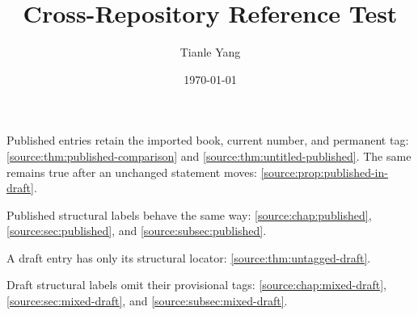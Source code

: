 \documentclass{noteformyself}
\title{Cross-Repository Reference Test}
\author{Tianle Yang}
\date{\today}
\begin{document}
\maketitle

Published entries retain the imported book, current number, and permanent tag:
\cref{source:thm:published-comparison} and
\cref{source:thm:untitled-published}. The same remains true after an unchanged
statement moves: \cref{source:prop:published-in-draft}.

Published structural labels behave the same way: \cref{source:chap:published},
\cref{source:sec:published}, and \cref{source:subsec:published}.

A draft entry has only its structural locator:
\cref{source:thm:untagged-draft}.

Draft structural labels omit their provisional tags:
\cref{source:chap:mixed-draft}, \cref{source:sec:mixed-draft}, and
\cref{source:subsec:mixed-draft}.
\end{document}
